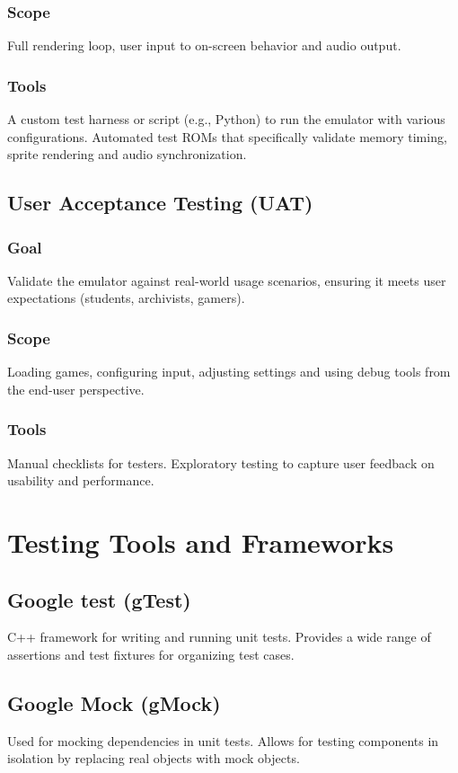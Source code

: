 \documentclass[a4paper, 11pt]{article}
\begin{document}
\subsubsection{Scope}
Full rendering loop, user input to on-screen behavior and audio output.

\subsubsection{Tools}
A custom test harness or script (e.g., Python) to run the emulator with various configurations. Automated test ROMs that specifically validate memory timing, sprite rendering and audio synchronization.

\subsection{User Acceptance Testing (UAT)}

\subsubsection{Goal}
Validate the emulator against real-world usage scenarios, ensuring it meets user expectations (students, archivists, gamers).

\subsubsection{Scope}
Loading games, configuring input, adjusting settings and using debug tools from the end-user perspective.

\subsubsection{Tools}
Manual checklists for testers. Exploratory testing to capture user feedback on usability and performance.

\section{Testing Tools and Frameworks}

\subsection{Google test (gTest)}
C++ framework for writing and running unit tests. Provides a wide range of assertions and test fixtures for organizing test cases.

\subsection{Google Mock (gMock)} 
Used for mocking dependencies in unit tests. Allows for testing components in isolation by replacing real objects with mock objects.
\end{document}
